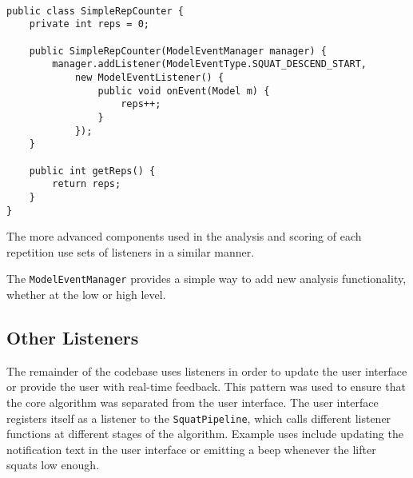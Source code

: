 \begin{lstlisting}[style=javastyle]

public class SimpleRepCounter {
	private int reps = 0;

	public SimpleRepCounter(ModelEventManager manager) {
		manager.addListener(ModelEventType.SQUAT_DESCEND_START,
			new ModelEventListener() {
				public void onEvent(Model m) {
					reps++;
				}
			});
	}

	public int getReps() {
		return reps;
	}
}

\end{lstlisting}


The more advanced components used in the analysis and scoring of each repetition use sets of listeners in a similar manner.

The \texttt{ModelEventManager} provides a simple way to add new analysis functionality, whether at the low or high level.

\subsection{Other Listeners}

The remainder of the codebase uses listeners in order to update the user interface or provide the user with real-time feedback. This pattern was used to ensure that the core algorithm was separated from the user interface. The user interface registers itself as a listener to the \texttt{SquatPipeline}, which calls different listener functions at different stages of the algorithm. Example uses include updating the notification text in the user interface or emitting a beep whenever the lifter squats low enough.